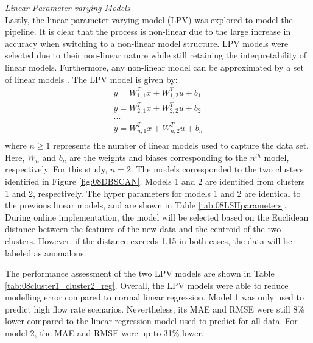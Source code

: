 %
%
\noindent
\textit{Linear Parameter-varying Models} \\
Lastly, the linear parameter-varying model (LPV) was explored to model the pipeline. It is clear that the process is non-linear due to the large increase in accuracy when switching to a non-linear model structure. LPV models were selected due to their non-linear nature while still retaining the interpretability of linear models. Furthermore, any non-linear model can be approximated by a set of linear models \cite{LPV}. The LPV model is given by:
\begin{equation}
    \begin{split}
        \hat{y} = W_{1, 1}^Tx + W_{1, 2}^Tu + b_1 \\
        \hat{y} = W_{2, 1}^Tx + W_{2, 2}^Tu+ b_2 \\
        ... \\
        \hat{y} = W_{n, 1}^Tx + W_{n, 2}^Tu + b_n \\
    \end{split}
    \label{eq:08LPV_structure}
\end{equation}
where $n \geq 1$ represents the number of linear models used to capture the data set. Here, $W_n$ and $b_n$ are the weights and biases corresponding to the $n^{th}$ model, respectively. For this study, $n=2$.  The models corresponded to the two clusters identified in Figure \ref{fig:08DBSCAN}.  Models 1 and 2 are identified from clusters 1 and 2, respectively.  The hyper parameters for models 1 and 2 are identical to the previous linear models, and are shown in Table \ref{tab:08LSHparameters}. During online implementation, the model will be selected based on the Euclidean distance between the features of the new data and the centroid of the two clusters.  However, if the distance exceeds 1.15 in both cases, the data will be labeled as anomalous.

The performance assessment of the two LPV models are shown in Table \ref{tab:08cluster1_cluster2_reg}. Overall, the LPV models were able to reduce modelling error compared to normal linear regression. Model 1 was only used to predict high flow rate scenarios. Nevertheless, its MAE and RMSE were still 8\% lower compared to the linear regression model used to predict for all data.  For model 2, the MAE and RMSE were up to 31\% lower. 

